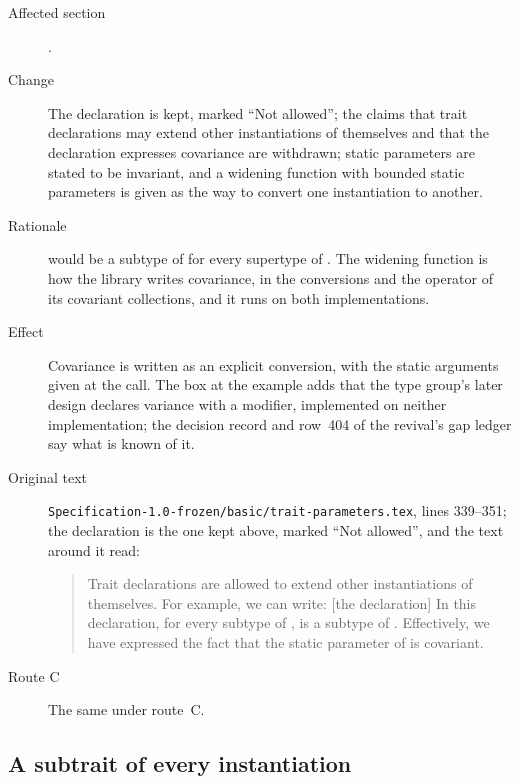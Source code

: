 \begin{description}
\item[Affected section] .
\item[Change] The declaration is kept, marked ``Not allowed''; the claims
that trait declarations may extend other instantiations of themselves and
that the declaration expresses covariance are withdrawn; static
parameters are stated to be invariant, and a widening function with
bounded static parameters is given as the way to convert one
instantiation to another.
\item[Rationale]  would be a subtype of
 for every supertype  of .
The widening function is how the library writes covariance, in the
conversions and the  operator of its covariant collections,
and it runs on both implementations.
\item[Effect] Covariance is written as an explicit conversion, with the
static arguments given at the call. The box at the example adds that the
type group's later design declares variance with a 
modifier, implemented on neither implementation; the decision record and
row~404 of the revival's gap ledger say what is known of it.
\item[Original text] \nolinkurl{Specification-1.0-frozen/basic/trait-parameters.tex},
lines 339--351; the declaration is the one kept above, marked
``Not allowed'', and the text around it read:
\begin{quote}
Trait declarations are allowed to extend other instantiations of
themselves. For example, we can write:
[the declaration]
In this declaration, for every subtype  of , 
is a subtype of . Effectively, we have expressed
  the fact that the static parameter  of  is covariant.
\end{quote}
\item[Route C] The same under route~C.
\end{description}

\subsection{A subtrait of every instantiation}

